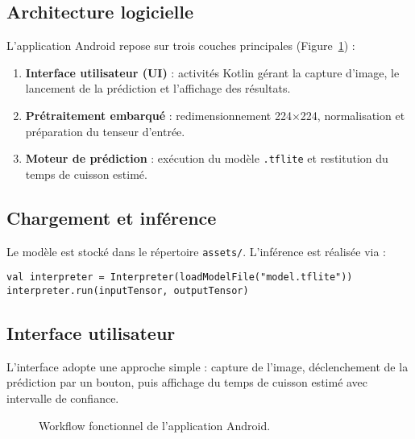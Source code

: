 \subsection{Architecture logicielle}
L’application Android repose sur trois couches principales (Figure~\ref{fig:archi_android}) :
\begin{enumerate}
\item \textbf{Interface utilisateur (UI)} : activités Kotlin gérant la capture d’image, le lancement de la prédiction et l’affichage des résultats.
\item \textbf{Prétraitement embarqué} : redimensionnement 224$\times$224, normalisation et préparation du tenseur d’entrée.
\item \textbf{Moteur de prédiction} : exécution du modèle \texttt{.tflite} et restitution du temps de cuisson estimé.
\end{enumerate}

\subsection{Chargement et inférence}
Le modèle est stocké dans le répertoire \texttt{assets/}. L’inférence est réalisée via :
\begin{verbatim}
val interpreter = Interpreter(loadModelFile("model.tflite"))
interpreter.run(inputTensor, outputTensor)
\end{verbatim}

\subsection{Interface utilisateur}
L’interface adopte une approche simple : capture de l’image, déclenchement de la prédiction par un bouton, puis affichage du temps de cuisson estimé avec intervalle de confiance.

\begin{figure}[h!]
\centering
{}
\caption{Workflow fonctionnel de l’application Android.}
\label{fig:archi_android}
\end{figure}

